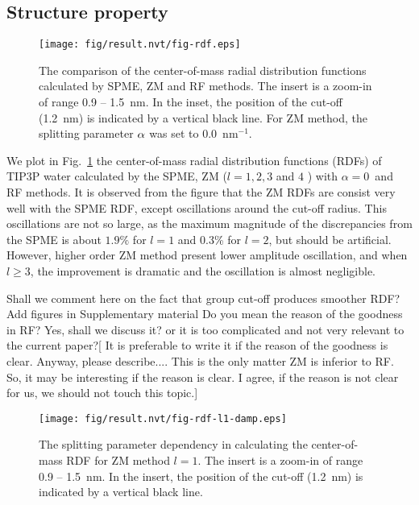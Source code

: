 \documentclass[a4paper,preprint,unsortedaddress,onecolumn,fleqn]{revtex4}
\newcommand{\recheck}[1]{{\color{red} #1}}
\begin{document}
\subsection{Structure property}

\begin{figure}[tbp]
\centering
\texttt{[image: fig/result.nvt/fig-rdf.eps]}
\caption{The comparison of the center-of-mass radial distribution functions
calculated by SPME, ZM and RF methods. The insert is a zoom-in of range 0.9
-- 1.5~nm. In the inset, the position of the cut-off (1.2~nm) is indicated
by a vertical black line. For ZM method, the splitting parameter $\protect%
\alpha $ was set to 0.0~$\text{nm}^{-1}$. }
\label{fig:rdf}
\end{figure}

We plot in Fig.~\ref{fig:rdf} the center-of-mass radial distribution
functions (RDFs) of TIP3P water calculated by the SPME, ZM ($l=1,2,3$ and $4$%
) with $\alpha =0$\ and RF methods. It is observed from the figure that the
ZM RDFs are consist very well with the SPME RDF, except oscillations around
the cut-off radius. This oscillations are not so large, as the maximum
magnitude of the discrepancies from the SPME is about \recheck{ $1.9\%$ for $l=1$ and 0.3\% for $l=2$,}
but should be artificial. However, higher order ZM method
present lower amplitude oscillation, and when $l\geq 3$, the improvement is
dramatic and the oscillation is almost negligible.

{\color{red} Shall we comment here on the fact that group cut-off produces
smoother RDF? Add figures in Supplementary material {\color{blue} Do you
mean the reason of the goodness in RF?} {\color{red} Yes, shall we discuss
it? or it is too complicated and not very relevant to the current paper?}[} {%
\color{blue} It is preferable to write it if the reason of the goodness is
clear. Anyway, please describe.... This is the only matter ZM is inferior to
RF. So, it may be interesting if the reason is clear. } \recheck{I agree, if the
reason is not clear for us, we should not touch this topic.}]

\begin{figure}[tbp]
\centering
\texttt{[image: fig/result.nvt/fig-rdf-l1-damp.eps]}
\caption{ The splitting parameter dependency in calculating the
center-of-mass RDF for ZM method $l=1$. The insert is a zoom-in of range 0.9
-- 1.5~nm. In the insert, the position of the cut-off (1.2~nm) is indicated
by a vertical black line. }
\label{fig:rdf-damp}
\end{figure}
\end{document}
